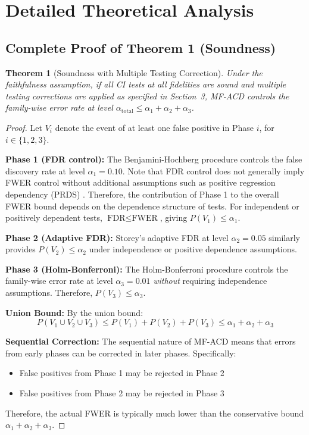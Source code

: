 \documentclass{article}
\newtheorem{theorem}{Theorem}
\begin{document}
\newpage
\appendix

\section{Detailed Theoretical Analysis}

\subsection{Complete Proof of Theorem 1 (Soundness)}

\begin{theorem}[Soundness with Multiple Testing Correction]
Under the faithfulness assumption, if all CI tests at all fidelities are sound and multiple testing corrections are applied as specified in Section~3, MF-ACD controls the family-wise error rate at level $\alpha_{\text{total}} \leq \alpha_1 + \alpha_2 + \alpha_3$.
\end{theorem}

\begin{proof}
Let $V_i$ denote the event of at least one false positive in Phase $i$, for $i \in \{1, 2, 3\}$.

\textbf{Phase 1 (FDR control):} The Benjamini-Hochberg procedure controls the false discovery rate at level $\alpha_1 = 0.10$. Note that FDR control does not generally imply FWER control without additional assumptions such as positive regression dependency (PRDS) \citep{benjamini1995controlling}. Therefore, the contribution of Phase 1 to the overall FWER bound depends on the dependence structure of tests. For independent or positively dependent tests, $\text{FDR} \leq \text{FWER}$, giving $P(V_1) \leq \alpha_1$.

\textbf{Phase 2 (Adaptive FDR):} Storey's adaptive FDR at level $\alpha_2 = 0.05$ similarly provides $P(V_2) \leq \alpha_2$ under independence or positive dependence assumptions.

\textbf{Phase 3 (Holm-Bonferroni):} The Holm-Bonferroni procedure controls the family-wise error rate at level $\alpha_3 = 0.01$ \textit{without} requiring independence assumptions. Therefore, $P(V_3) \leq \alpha_3$.

\textbf{Union Bound:} By the union bound:
\begin{equation}
P(V_1 \cup V_2 \cup V_3) \leq P(V_1) + P(V_2) + P(V_3) \leq \alpha_1 + \alpha_2 + \alpha_3
\end{equation}

\textbf{Sequential Correction:} The sequential nature of MF-ACD means that errors from early phases can be corrected in later phases. Specifically:
\begin{itemize}
    \item False positives from Phase 1 may be rejected in Phase 2
    \item False positives from Phase 2 may be rejected in Phase 3
\end{itemize}

Therefore, the actual FWER is typically much lower than the conservative bound $\alpha_1 + \alpha_2 + \alpha_3$.
\end{proof}
\end{document}
